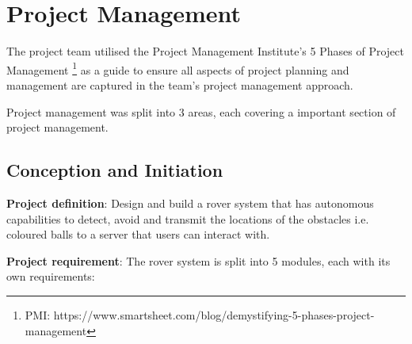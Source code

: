 \documentclass[11pt, a4paper]{article}
\begin{document}
\renewcommand{\baselinestretch}{0.75}\normalsize
\tableofcontents
\renewcommand{\baselinestretch}{1.0}\normalsize

\pagebreak

\section{Project Management}

The project team utilised the Project Management Institute's 5 Phases of Project Management \footnote{PMI: https://www.smartsheet.com/blog/demystifying-5-phases-project-management} as a guide to ensure all aspects of project planning and management are captured in the team's project management approach. 

Project management was split into 3 areas, each covering a important section of project management.

\subsection{Conception and Initiation}

\textbf{Project definition}: Design and build a rover system that has autonomous capabilities to detect, avoid and transmit the locations of the obstacles i.e. coloured balls to a server that users can interact with.

\textbf{Project requirement}: The rover system is split into 5 modules, each with its own requirements:
\end{document}
